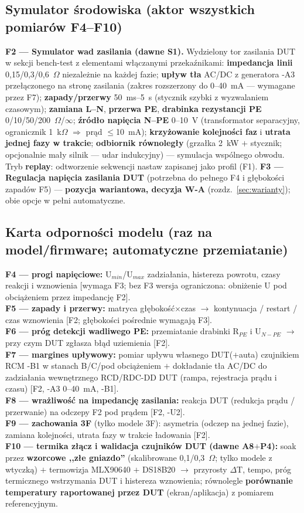 \documentclass[11pt,a4paper]{article}
\newcommand{\ohm}{$\Omega$}
\begin{document}
\subsection{Symulator środowiska (aktor wszystkich pomiarów F4--F10)}
\textbf{F2 --- Symulator wad zasilania (dawne S1).} Wydzielony tor zasilania DUT w sekcji
bench-test z elementami włączanymi przekaźnikami: \textbf{impedancja linii} 0{,}15/0{,}3/0{,}6~\ohm{}
niezależnie na każdej fazie; \textbf{upływ tła} AC/DC z generatora -A3 przełączonego na stronę
zasilania (zakres rozszerzony do 0--40~mA --- wymagane przez F7); \textbf{zapady/przerwy}
50~ms--5~s (stycznik szybki z wyzwalaniem czasowym); \textbf{zamiana L--N}, \textbf{przerwa PE},
\textbf{drabinka rezystancji PE} 0/10/50/200~\ohm{}/$\infty$; \textbf{źródło napięcia N--PE}
0--10~V (transformator separacyjny, ogranicznik 1~k\ohm{} $\Rightarrow$ prąd $\le$10~mA);
\textbf{krzyżowanie kolejności faz} i \textbf{utrata jednej fazy w trakcie}; \textbf{odbiornik
równoległy} (grzałka 2~kW $+$ stycznik; opcjonalnie mały silnik --- udar indukcyjny) --- symulacja
wspólnego obwodu. Tryb \textbf{replay}: odtworzenie sekwencji nastaw zapisanej jako profil (F1).
\textbf{F3 --- Regulacja napięcia zasilania DUT} (potrzebna do pełnego F4 i głębokości zapadów F5)
--- \textbf{pozycja wariantowa, decyzja W-A} (rozdz.~\ref{sec:warianty}); obie opcje w pełni
automatyczne.

\subsection{Karta odporności modelu (raz na model/firmware; automatyczne przemiatanie)}
\textbf{F4 --- progi napięciowe:} U$_{min}$/U$_{max}$ zadziałania, histereza powrotu, czasy
reakcji i wznowienia [wymaga F3; bez F3 wersja ograniczona: obniżenie U pod obciążeniem przez
impedancję F2].\\
\textbf{F5 --- zapady i przerwy:} matryca głębokość$\times$czas $\to$ kontynuacja / restart /
czas wznowienia [F2; głębokości pośrednie wymagają F3].\\
\textbf{F6 --- próg detekcji wadliwego PE:} przemiatanie drabinki R$_{PE}$ i U$_{N-PE}$ $\to$
przy czym DUT zgłasza błąd uziemienia [F2].\\
\textbf{F7 --- margines upływowy:} pomiar upływu własnego DUT($+$auta) czujnikiem RCM -B1
w stanach B/C/pod obciążeniem $+$ dokładanie tła AC/DC do zadziałania wewnętrznego RCD/RDC-DD
DUT (rampa, rejestracja prądu i czasu) [F2, -A3 0--40~mA, -B1].\\
\textbf{F8 --- wrażliwość na impedancję zasilania:} reakcja DUT (redukcja prądu / przerwanie) na
odczepy F2 pod prądem [F2, -U2].\\
\textbf{F9 --- zachowania 3F} (tylko modele 3F): asymetria (odczep na jednej fazie), zamiana
kolejności, utrata fazy w trakcie ładowania [F2].\\
\textbf{F10 --- termika złącz i walidacja czujników DUT (dawne A8$+$P4):} soak przez
\textbf{wzorcowe ,,złe gniazdo''} (skalibrowane 0{,}1/0{,}3~\ohm; tylko modele z wtyczką) $+$
termowizja MLX90640 $+$ DS18B20 $\to$ przyrosty $\Delta$T, tempo, próg termicznego wstrzymania
DUT i histereza wznowienia; równolegle \textbf{porównanie temperatury raportowanej przez DUT}
(ekran/aplikacja) z pomiarem referencyjnym.
\end{document}
